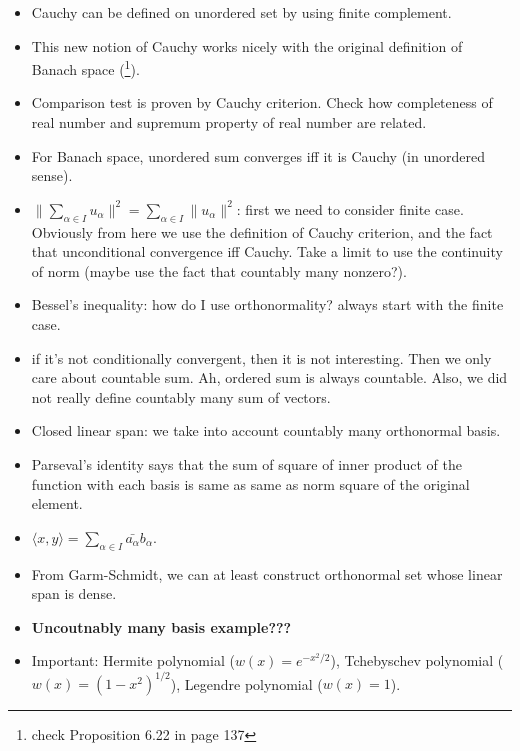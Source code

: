 \documentclass{article}
\theoremstyle{remark}
\begin{document}
\begin{itemize}
\item Cauchy can be defined on unordered set by using finite complement.
\item This new notion of Cauchy works nicely with the original definition of Banach space (\footnote{check Proposition 6.22 in page 137}).
\item Comparison test is proven by Cauchy criterion. Check how completeness of real number and supremum property of real number are related.
\item For Banach space, unordered sum converges iff it is Cauchy (in unordered sense).
\item $\lVert\sum_{\alpha\in I}u_\alpha\rVert^2=\sum_{\alpha\in I}\lVert u_\alpha\rVert^2$: first we need to consider finite case. Obviously from here we use the definition of Cauchy criterion, and the fact that unconditional convergence iff Cauchy. Take a limit to use the continuity of norm (maybe use the fact that countably many nonzero?).
\item Bessel's inequality: how do I use orthonormality? always start with the finite case. 
\item if it's not conditionally convergent, then it is not interesting. Then we only care about countable sum. Ah, ordered sum is always countable. Also, we did not really define countably many sum of vectors.
\item Closed linear span: we take into account countably many orthonormal basis.
\item Parseval's identity says that the sum of square of inner product of the function with each basis is same as same as norm square of the original element.
\item $\langle x,y\rangle=\sum_{\alpha\in I}\bar{a_\alpha}b_\alpha$.
\item From Garm-Schmidt, we can at least construct orthonormal set whose linear span is dense.
\item \textbf{Uncoutnably many basis example???}
\item Important: Hermite polynomial ($w(x)=e^{-x^2/2}$), Tchebyschev polynomial ($w(x)=(1-x^2)^{1/2}$), Legendre polynomial ($w(x)=1$).


\end{itemize}
\end{document}
